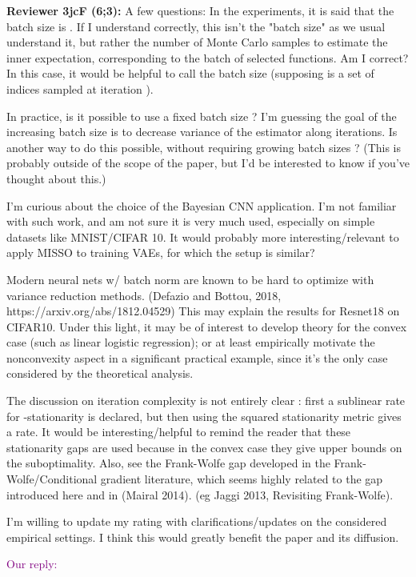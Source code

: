 \documentclass{article}
\begin{document}
\textbf{Reviewer 3jcF (6;3):}
A few questions: In the experiments, it is said that the batch size is . If I understand correctly, this isn't the "batch size" as we usual understand it, but rather the number of Monte Carlo samples to estimate the inner expectation, corresponding to the batch of selected functions. Am I correct? In this case, it would be helpful to call  the batch size (supposing  is a set of indices sampled at iteration ).

In practice, is it possible to use a fixed batch size ? I'm guessing the goal of the increasing batch size is to decrease variance of the estimator along iterations. Is another way to do this possible, without requiring growing batch sizes ? (This is probably outside of the scope of the paper, but I'd be interested to know if you've thought about this.)

I'm curious about the choice of the Bayesian CNN application. I'm not familiar with such work, and am not sure it is very much used, especially on simple datasets like MNIST/CIFAR 10. It would probably more interesting/relevant to apply MISSO to training VAEs, for which the setup is similar?

Modern neural nets w/ batch norm are known to be hard to optimize with variance reduction methods. (Defazio and Bottou, 2018, https://arxiv.org/abs/1812.04529) This may explain the results for Resnet18 on CIFAR10. Under this light, it may be of interest to develop theory for the convex case (such as linear logistic regression); or at least empirically motivate the nonconvexity aspect in a significant practical example, since it's the only case considered by the theoretical analysis.

The discussion on iteration complexity is not entirely clear : first a sublinear  rate for -stationarity is declared, but then using the squared stationarity metric gives a  rate. It would be interesting/helpful to remind the reader that these stationarity gaps are used because in the convex case they give upper bounds on the suboptimality. Also, see the Frank-Wolfe gap developed in the Frank-Wolfe/Conditional gradient literature, which seems highly related to the  gap introduced here and in (Mairal 2014). (eg Jaggi 2013, Revisiting Frank-Wolfe).

I'm willing to update my rating with clarifications/updates on the considered empirical settings. I think this would greatly benefit the paper and its diffusion.



\textcolor{purple}{Our reply:}
\end{document}
